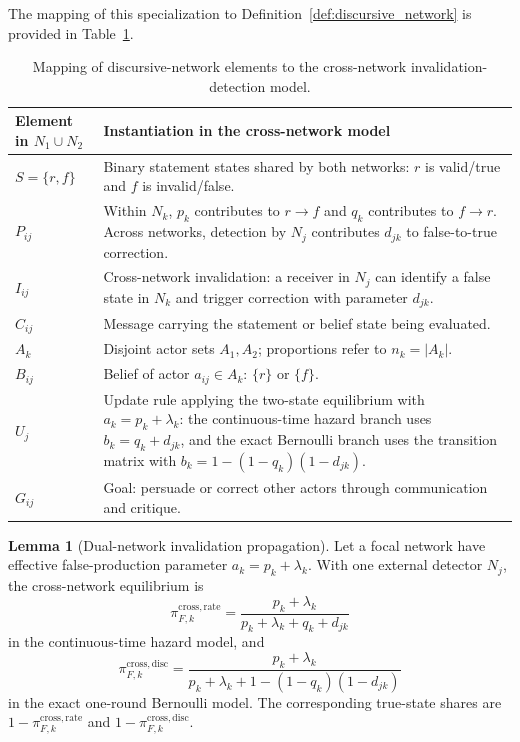 \documentclass[12pt]{article}
\theoremstyle{definition}
\newtheorem{lemma}{Lemma}[section]
\begin{document}
The mapping of this specialization to Definition~\ref{def:discursive_network}
is provided in Table~\ref{tab:Dual-Network}.

\begin{table}[htbp]
    \centering
    \setlength{\tabcolsep}{6pt}
    \renewcommand{\arraystretch}{1.15}
    \caption{Mapping of discursive-network elements to the cross-network invalidation-detection model.}
    \label{tab:Dual-Network}
    \begin{tabularx}{6.5in}{@{}lX@{}}
        \toprule
        \textbf{Element in $N_{1}\cup N_{2}$} & \textbf{Instantiation in the cross-network model} \\
        \midrule
        $S=\{r,f\}$ & Binary statement states shared by both networks: $r$ is valid/true and $f$ is invalid/false.\\
        $P_{ij}$ & Within $N_k$, $p_k$ contributes to $r\to f$ and $q_k$ contributes to $f\to r$. Across networks, detection by $N_j$ contributes $d_{jk}$ to false-to-true correction.\\
        $I_{ij}$ & Cross-network invalidation: a receiver in $N_j$ can identify a false state in $N_k$ and trigger correction with parameter $d_{jk}$.\\
        $C_{ij}$ & Message carrying the statement or belief state being evaluated.\\
        $A_k$ & Disjoint actor sets $A_1,A_2$; proportions refer to $n_k=|A_k|$.\\
        $B_{ij}$ & Belief of actor $a_{ij}\in A_k$: $\{r\}$ or $\{f\}$.\\
        $U_j$ & Update rule applying the two-state equilibrium with $a_k=p_k+\lambda_k$: the continuous-time hazard branch uses $b_k=q_k+d_{jk}$, and the exact Bernoulli branch uses the transition matrix with $b_k=1-(1-q_k)(1-d_{jk})$.\\
        $G_{ij}$ & Goal: persuade or correct other actors through communication and critique.\\
        \bottomrule
    \end{tabularx}
\end{table}

\begin{lemma}[Dual-network invalidation propagation]
\label{lem:expected_equilibrium}
Let a focal network have effective false-production parameter $a_k=p_k+\lambda_k$.
With one external detector $N_j$, the cross-network equilibrium is
\[
\pi_{F,k}^{\mathrm{cross,rate}}
=
\frac{p_k+\lambda_k}{p_k+\lambda_k+q_k+d_{jk}}
\]
in the continuous-time hazard model, and
\[
\pi_{F,k}^{\mathrm{cross,disc}}
=
\frac{p_k+\lambda_k}{p_k+\lambda_k+1-(1-q_k)(1-d_{jk})}
\]
in the exact one-round Bernoulli model.  The corresponding true-state shares are
$1-\pi_{F,k}^{\mathrm{cross,rate}}$ and
$1-\pi_{F,k}^{\mathrm{cross,disc}}$.
\end{lemma}
\end{document}
